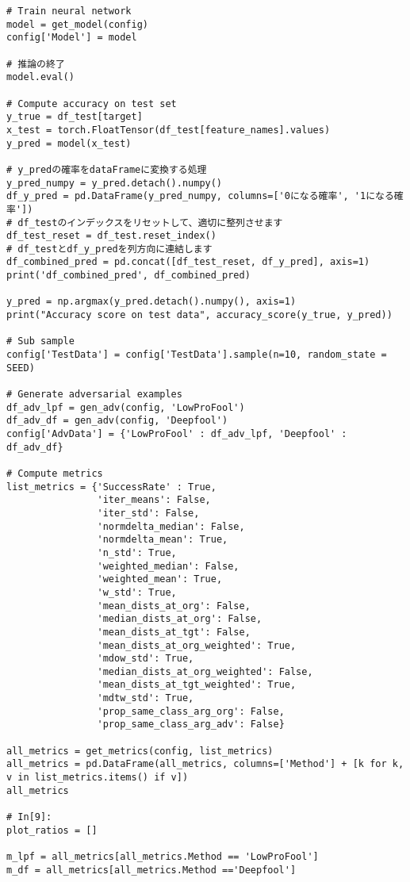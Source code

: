 \begin{lstlisting}[style=jupyter, caption=敵対的サンプルを生成する流れの処理]
# Train neural network
model = get_model(config)
config['Model'] = model

# 推論の終了
model.eval()

# Compute accuracy on test set
y_true = df_test[target]
x_test = torch.FloatTensor(df_test[feature_names].values)
y_pred = model(x_test)

# y_predの確率をdataFrameに変換する処理
y_pred_numpy = y_pred.detach().numpy()
df_y_pred = pd.DataFrame(y_pred_numpy, columns=['0になる確率', '1になる確率'])    
# df_testのインデックスをリセットして、適切に整列させます
df_test_reset = df_test.reset_index()
# df_testとdf_y_predを列方向に連結します
df_combined_pred = pd.concat([df_test_reset, df_y_pred], axis=1)
print('df_combined_pred', df_combined_pred)

y_pred = np.argmax(y_pred.detach().numpy(), axis=1)
print("Accuracy score on test data", accuracy_score(y_true, y_pred))
    
# Sub sample
config['TestData'] = config['TestData'].sample(n=10, random_state = SEED)

# Generate adversarial examples
df_adv_lpf = gen_adv(config, 'LowProFool')
df_adv_df = gen_adv(config, 'Deepfool')
config['AdvData'] = {'LowProFool' : df_adv_lpf, 'Deepfool' : df_adv_df}

# Compute metrics
list_metrics = {'SuccessRate' : True,
                'iter_means': False,
                'iter_std': False,
                'normdelta_median': False,
                'normdelta_mean': True,
                'n_std': True,
                'weighted_median': False,
                'weighted_mean': True,
                'w_std': True,
                'mean_dists_at_org': False,
                'median_dists_at_org': False,
                'mean_dists_at_tgt': False,
                'mean_dists_at_org_weighted': True,
                'mdow_std': True,
                'median_dists_at_org_weighted': False,
                'mean_dists_at_tgt_weighted': True,
                'mdtw_std': True,
                'prop_same_class_arg_org': False,
                'prop_same_class_arg_adv': False}

all_metrics = get_metrics(config, list_metrics)
all_metrics = pd.DataFrame(all_metrics, columns=['Method'] + [k for k, v in list_metrics.items() if v])
all_metrics

# In[9]:
plot_ratios = []

m_lpf = all_metrics[all_metrics.Method == 'LowProFool']
m_df = all_metrics[all_metrics.Method =='Deepfool']


\end{lstlisting}
